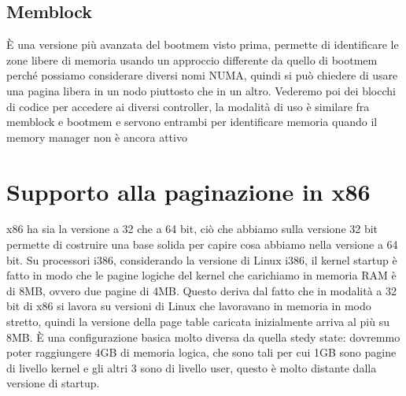\documentclass[12pt, oneside]{extbook}
\begin{document}
\subsection{Memblock}
È una versione più avanzata del bootmem visto prima, permette di identificare le zone libere di memoria usando un approccio differente da quello di bootmem perché possiamo considerare diversi nomi NUMA, quindi si può chiedere di usare una pagina libera in un nodo piuttosto che in un altro. Vederemo poi dei blocchi di codice per accedere ai diversi controller, la modalità di uso è similare fra memblock e bootmem e servono entrambi per identificare memoria quando il memory manager non è ancora attivo
\section{Supporto alla paginazione in x86}
x86 ha sia la versione a 32 che a 64 bit, ciò che abbiamo sulla versione 32 bit permette di costruire una base solida per capire cosa abbiamo nella versione a 64 bit. Su processori i386, considerando la versione di Linux i386, il kernel startup è fatto in modo che le pagine logiche del kernel che carichiamo in memoria RAM è di 8MB, ovvero due pagine di 4MB. Questo deriva dal fatto che in modalità a 32 bit di x86 si lavora su versioni di Linux che lavoravano in memoria in modo stretto, quindi la versione della page table caricata inizialmente arriva al più su 8MB. È una configurazione basica molto diversa da quella stedy state: dovremmo poter raggiungere 4GB di memoria logica, che sono tali per cui 1GB sono pagine di livello kernel e gli altri 3 sono di livello user, questo è molto distante dalla versione di startup.
\end{document}
